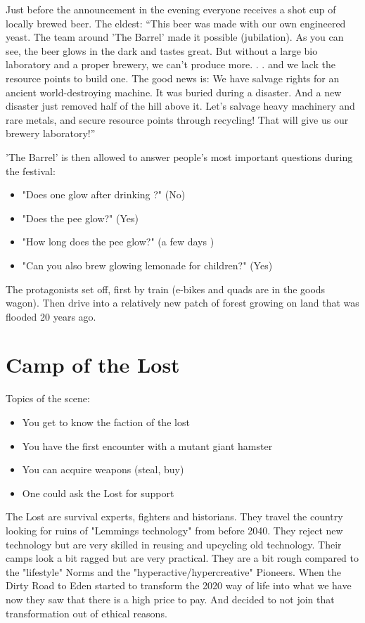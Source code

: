 Just before the announcement in the evening everyone receives a shot cup of locally brewed beer. The eldest: “This beer was made with our own engineered yeast. The team around 'The Barrel' made it possible (jubilation). As you can see, the beer glows in the dark and tastes great. But without a large bio laboratory and a proper brewery, we can't produce more. . . and we lack the resource points to build one. The good news is: We have salvage rights for an ancient world-destroying machine. It was buried during a  disaster. And a new disaster just removed half of the hill above it. Let's salvage heavy machinery and rare metals, and secure resource points through recycling! That will give us our brewery laboratory!”

'The Barrel' is then allowed to answer people's most important questions during the festival: 
\begin{itemize}
\item "Does one glow after drinking ?" (No)
\item "Does the pee glow?" (Yes)
\item "How long does the pee glow?" (a few days )
\item "Can you also brew glowing lemonade for children?" (Yes)
\end{itemize}

The protagonists set off, first by train (e-bikes and quads are in the goods wagon). Then drive into a relatively new patch of forest growing on land that was flooded 20 years ago.


\section{Camp of the Lost}

Topics of the scene:

\begin{itemize}
\item You get to know the faction of the lost
\item You have the first encounter with a mutant giant hamster
\item You can acquire weapons (steal, buy)
\item One could ask the Lost for support
\end{itemize}

\begin{sidebarBox}[title=The Lost]
The Lost are survival experts, fighters and historians. They travel the country looking for ruins of "Lemmings technology" from before 2040. They reject new technology but are very skilled in reusing and upcycling old technology. Their camps look a bit ragged but are very practical. They are a bit rough compared to the "lifestyle" Norms and the "hyperactive/hypercreative" Pioneers. When the Dirty Road to Eden started to transform the 2020 way of life into what we have now they saw that there is a high price to pay. And decided to not join that transformation out of ethical reasons.
\end{sidebarBox}


